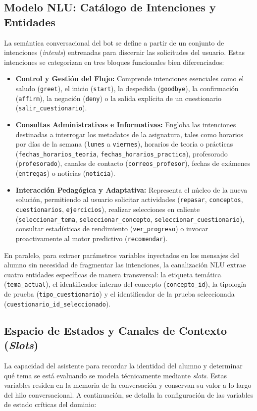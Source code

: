 \documentclass[a4paper,12pt,twoside,final]{book}
\begin{document}
\subsection{Modelo NLU: Catálogo de Intenciones y Entidades}
La semántica conversacional del bot se define a partir de un conjunto de intenciones (\textit{intents}) entrenadas para discernir las solicitudes del usuario. Estas intenciones se categorizan en tres bloques funcionales bien diferenciados:
\begin{itemize}
    \item \textbf{Control y Gestión del Flujo:} Comprende intenciones esenciales como el saludo (\texttt{greet}), el inicio (\texttt{start}), la despedida (\texttt{goodbye}), la confirmación (\texttt{affirm}), la negación (\texttt{deny}) o la salida explícita de un cuestionario (\texttt{salir\_cuestionario}).
    \item \textbf{Consultas Administrativas e Informativas:} Engloba las intenciones destinadas a interrogar los metadatos de la asignatura, tales como horarios por días de la semana (\texttt{lunes} a \texttt{viernes}), horarios de teoría o prácticas (\texttt{fechas\_horarios\_teoria}, \texttt{fechas\_horarios\_practica}), profesorado (\texttt{profesorado}), canales de contacto (\texttt{correos\_profesor}), fechas de exámenes (\texttt{entregas}) o noticias (\texttt{noticia}).
    \item \textbf{Interacción Pedagógica y Adaptativa:} Representa el núcleo de la nueva solución, permitiendo al usuario solicitar actividades (\texttt{repasar}, \texttt{conceptos}, \texttt{cuestionarios}, \texttt{ejercicios}), realizar selecciones en caliente (\texttt{seleccionar\_tema}, \texttt{seleccionar\_concepto}, \texttt{seleccionar\_cuestionario}), consultar estadísticas de rendimiento (\texttt{ver\_progreso}) o invocar proactivamente al motor predictivo (\texttt{recomendar}).
\end{itemize}

En paralelo, para extraer parámetros variables inyectados en los mensajes del alumno sin necesidad de fragmentar las intenciones, la canalización NLU extrae cuatro entidades específicas de manera transversal: la etiqueta temática (\texttt{tema\_actual}), el identificador interno del concepto (\texttt{concepto\_id}), la tipología de prueba (\texttt{tipo\_cuestionario}) y el identificador de la prueba seleccionada (\texttt{cuestionario\_id\_seleccionado}).

\subsection{Espacio de Estados y Canales de Contexto (\textit{Slots})}
La capacidad del asistente para recordar la identidad del alumno y determinar qué tema se está evaluando se modela técnicamente mediante \textit{slots}. Estas variables residen en la memoria de la conversación y conservan su valor a lo largo del hilo conversacional. A continuación, se detalla la configuración de las variables de estado críticas del dominio:
\end{document}
